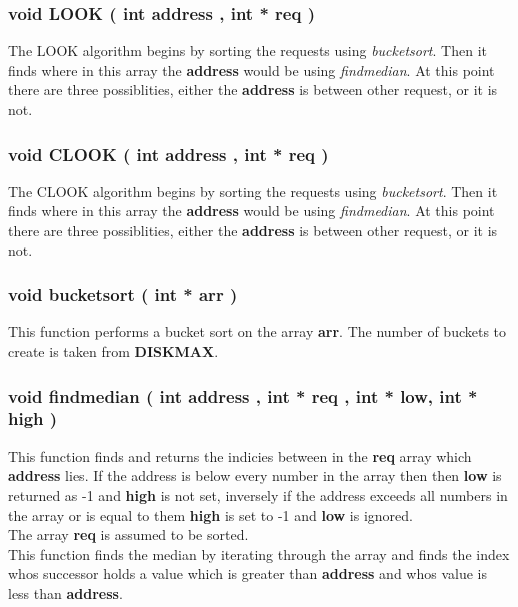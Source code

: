 \documentclass[11pt]{article}
\begin{document}
\subsubsection{ void LOOK ( int address ,  int * req )}
The LOOK algorithm begins by sorting the requests using \textit{bucket\textunderscore sort}. Then it finds where in this array the \textbf{address} would be using \textit{find\textunderscore median}. At this point there are three possiblities, either the \textbf{address} is between other request, or it is not.

\subsubsection{ void CLOOK ( int address ,  int * req )}
The CLOOK algorithm begins by sorting the requests using \textit{bucket\textunderscore sort}. Then it finds where in this array the \textbf{address} would be using \textit{find\textunderscore median}. At this point there are three possiblities, either the \textbf{address} is between other request, or it is not.

\subsubsection{ void bucket\textunderscore sort ( int * arr )}
This function performs a bucket sort on the array \textbf{arr}. The number of buckets to create is taken from \textbf{DISK\textunderscore MAX}. 

\subsubsection{ void find\textunderscore median ( int address ,  int * req , int * low, int * high )}
This function finds and returns the indicies between in the \textbf{req} array which \textbf{address} lies. If the address is below every number in the array then then \textbf{low} is returned as -1 and \textbf{high} is not set, inversely if the address exceeds all numbers in the array or is equal to them \textbf{high} is set to -1 and \textbf{low} is ignored.
\\
The array \textbf{req} is assumed to be sorted.
\\
This function finds the median by iterating through the array and finds the index whos successor holds a value which is greater than \textbf{address} and whos value is less than \textbf{address}. 
\end{document}
